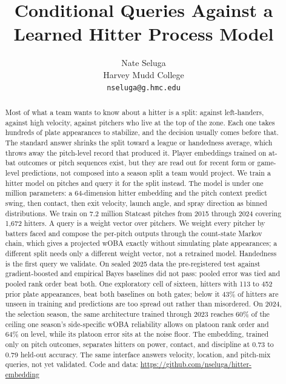 \documentclass[11pt]{article}
\title{Conditional Queries Against a Learned Hitter Process Model}
\author{Nate Seluga\\ Harvey Mudd College \\ \texttt{nseluga@g.hmc.edu}}
\date{}
\begin{document}
\maketitle

\begin{abstract}
Most of what a team wants to know about a hitter is a split: against left-handers, against high velocity, against pitchers who live at the top of the zone. Each one takes hundreds of plate appearances to stabilize, and the decision usually comes before that. The standard answer shrinks the split toward a league or handedness average, which throws away the pitch-level record that produced it. Player embeddings trained on at-bat outcomes or pitch sequences exist, but they are read out for recent form or game-level predictions, not composed into a season split a team would project. We train a hitter model on pitches and query it for the split instead. The model is under one million parameters: a 64-dimension hitter embedding and the pitch context predict swing, then contact, then exit velocity, launch angle, and spray direction as binned distributions. We train on 7.2 million Statcast pitches from 2015 through 2024 covering 1,672 hitters. A query is a weight vector over pitchers. We weight every pitcher by batters faced and compose the per-pitch outputs through the count-state Markov chain, which gives a projected wOBA exactly without simulating plate appearances; a different split needs only a different weight vector, not a retrained model. Handedness is the first query we validate. On sealed 2025 data the pre-registered test against gradient-boosted and empirical Bayes baselines did not pass: pooled error was tied and pooled rank order beat both. One exploratory cell of sixteen, hitters with 113 to 452 prior plate appearances, beat both baselines on both gates; below it 43\% of hitters are unseen in training and predictions are too spread out rather than misordered. On 2024, the selection season, the same architecture trained through 2023 reaches 60\% of the ceiling one season's side-specific wOBA reliability allows on platoon rank order and 64\% on level, while its platoon error sits at the noise floor. The embedding, trained only on pitch outcomes, separates hitters on power, contact, and discipline at 0.73 to 0.79 held-out accuracy. The same interface answers velocity, location, and pitch-mix queries, not yet validated. Code and data: \url{https://github.com/nseluga/hitter-embedding} %
\end{abstract}
\end{document}
